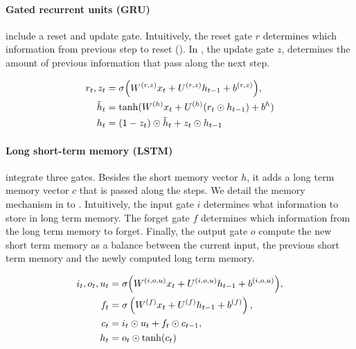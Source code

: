 
\paragraph{Gated recurrent units (GRU)} include a reset and update gate. Intuitively, the reset gate $r$ determines which information from previous step to reset (). In , the update gate $z$, determines the amount of previous information that pass along the next step.

\begin{align}
r_t, z_t &=\sigma \Big( W^{(r, z)} x_t + U^{(r, z)} h_{t-1} + b^{(r, z)} \Big), \labeq{gru-def-first}\\
\tilde{h}_t &= \tanh(W^{(h)} x_t + U^{(h)} (r_t \odot h_{t-1}) +b^h) \labeq{gru-def-reset} \\
h_t &= (1-z_t) \odot \tilde{h}_t + z_t \odot h_{t-1} \labeq{gru-def-last}
\end{align}

\paragraph{Long short-term memory (LSTM)} integrate three gates. Besides the short memory vector $h$, it adds a long term memory vector $c$ that is passed along the steps. We detail the memory mechanism in  to . Intuitively, the input gate $i$ determines what information to store in long term memory. The forget gate $f$ determines which information from the long term memory to forget. Finally, the output gate $o$ compute the new short term memory as a balance between the current input, the previous short term memory and the newly computed long term memory.

\begin{align}
i_t, o_t, u_t &=\sigma \Big( W^{(i, o, u)} x_t + U^{(i, o, u)} h_{t-1} + b^{(i, o, u)} \Big), \labeq{lstm-def-first}\\
f_{t} &= \sigma\left( W^{(f)} x_t + U^{(f)} h_{t-1} + b^{(f)} \right), \labeq{lstm-def-f}\\
c_t &= i_t \odot u_t + f_{t} \odot c_{t-1}, \\
h_t &= o_t \odot \tanh(c_t) \labeq{lstm-def-last}
\end{align}

